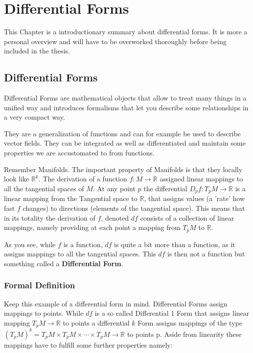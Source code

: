 \chapter{Differential Forms}

This Chapter is a introductionary summary about differential forms. It is more a personal overview and will have to be overworked thoroughly before being included in the thesis.

\section{Differential Forms}

Differential Forms are mathematical objects that allow to treat many things in a unified way and introduces formalisms that let you describe some relationships in a very compact way.

They are a generalization of functions and can for example be used to describe vector fields. They can be integrated as well as differentiated and maintain some properties we are accustomated to from functions.

Remember Manifolds. The important property of Manifolds is that they locally look like $\mathbb R^k$. The derivation of a function $f:M \rightarrow \mathbb R$ assigned linear mappings to all the tangential spaces of $M$. At any point $p$ the differential $D_pf: T_p M \rightarrow \mathbb R$ is a linear mapping from the Tangential space to $\mathbb R$, that assigns values (a 'rate' how fast $f$ changes) to directions (elements of the tangential space).
This means that in its totality the derivation of $f$, denoted $df$ consists of a collection of linear mappings, namely providing at each point a mapping from $T_pM$ to $\mathbb R$. 

As you see, while $f$ is a function, $df$ is quite a bit more than a function, as it assigns mappings to all the tangential spaces. This $df$ is then not a function but something called a \textbf{Differential Form}.

\subsection{Formal Definition}
Keep this example of a differential form in mind. Differential Forms assign mappings to points. While $df$ is a so called Differential 1 Form that assigns linear mapping $T_pM \rightarrow \mathbb R$ to points a differential $k$ Form assigns mappings of the type $(T_pM)^k = T_pM \times T_pM \times \cdots \times T_pM \rightarrow \mathbb R$ to points p. Aside from linearity these mappings have to fulfill some further properties namely:

